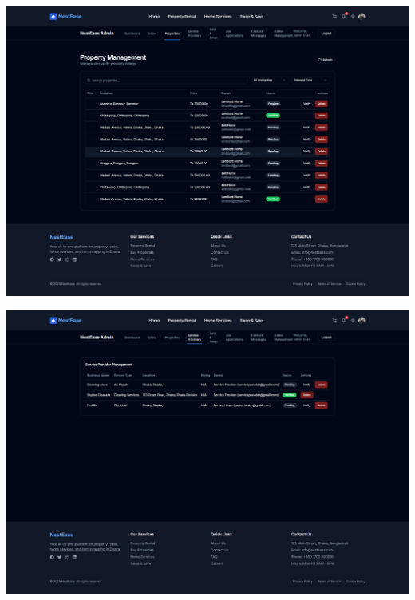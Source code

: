 \documentclass[conference]{IEEEtran}
\begin{document}
\begin{center}
\noindent
\begin{minipage}[t]{0.45\textwidth}
\includegraphics[width=\linewidth]{Project Screenshot/Admin Properties.png}
\end{minipage} \hfill
\begin{minipage}[t]{0.45\textwidth}
\includegraphics[width=\linewidth]{Project Screenshot/Admin Service Provider.png}
\end{minipage}


\end{center}
\end{document}
